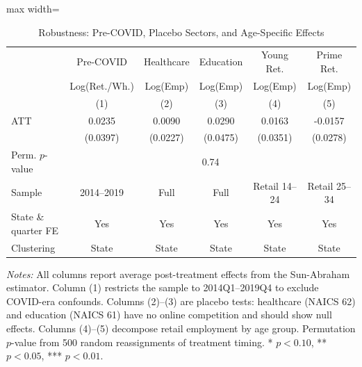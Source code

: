 \begin{table}[t]
\centering
\caption{Robustness: Pre-COVID, Placebo Sectors, and Age-Specific Effects}
\label{tab:robustness}
\begin{adjustbox}{max width=\textwidth}
\begin{tabular}{lccccc}
\hline\hline
& Pre-COVID & Healthcare & Education & Young Ret. & Prime Ret. \\
& Log(Ret./Wh.) & Log(Emp) & Log(Emp) & Log(Emp) & Log(Emp) \\
& (1) & (2) & (3) & (4) & (5) \\
\hline
ATT & 0.0235 & 0.0090 & 0.0290 & 0.0163 & -0.0157 \\
& (0.0397) & (0.0227) & (0.0475) & (0.0351) & (0.0278) \\
\hline
Perm. $p$-value & \multicolumn{5}{c}{0.74} \\
Sample & 2014--2019 & Full & Full & Retail 14--24 & Retail 25--34 \\
State \& quarter FE & Yes & Yes & Yes & Yes & Yes \\
Clustering & State & State & State & State & State \\
\hline\hline
\end{tabular}
\end{adjustbox}
\begin{tablenotes}
\small
\item \textit{Notes:} All columns report average post-treatment effects from the Sun-Abraham estimator. Column (1) restricts the sample to 2014Q1--2019Q4 to exclude COVID-era confounds. Columns (2)--(3) are placebo tests: healthcare (NAICS 62) and education (NAICS 61) have no online competition and should show null effects. Columns (4)--(5) decompose retail employment by age group. Permutation $p$-value from 500 random reassignments of treatment timing. * $p<0.10$, ** $p<0.05$, *** $p<0.01$.
\end{tablenotes}
\end{table}
